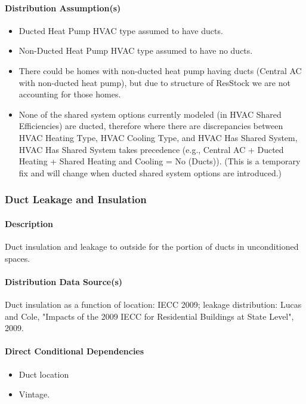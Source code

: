 \paragraph{Distribution Assumption(s)}
\begin{itemize}
    \item Ducted Heat Pump HVAC type assumed to have ducts.
    \item Non-Ducted Heat Pump HVAC type assumed to have no ducts.
    \item There could be homes with non-ducted heat pump having ducts (Central AC with non-ducted heat pump), but due to structure of ResStock we are not accounting for those homes.
    \item None of the shared system options currently modeled (in HVAC Shared Efficiencies) are ducted, therefore where there are discrepancies between HVAC Heating Type, HVAC Cooling Type, and HVAC Has Shared System, HVAC Has Shared System takes precedence (e.g., Central AC + Ducted Heating + Shared Heating and Cooling = No (Ducts)). (This is a temporary fix and will change when ducted shared system options are introduced.)
\end{itemize}
 

\subsubsection{Duct Leakage and Insulation}

\paragraph{Description}
Duct insulation and leakage to outside for the portion of ducts in unconditioned spaces.
\paragraph{Distribution Data Source(s)}
Duct insulation as a function of location: IECC 2009; leakage 
distribution: Lucas and Cole, "Impacts of the 2009 IECC for Residential Buildings at State Level", 2009.
\paragraph{Direct Conditional Dependencies}
\begin{itemize}
    \item Duct location
    \item Vintage.
\end{itemize}
